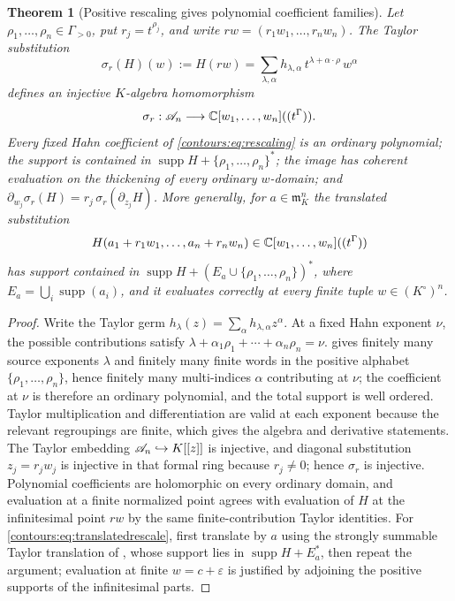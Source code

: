 \documentclass[11pt,letterpaper]{article}
\newtheorem{theorem}{Theorem}[section]
\theoremstyle{definition}
\theoremstyle{remark}
\newcommand{\m}{\mathfrak m}\newcommand{\st}{\operatorname{st}}
\newcommand{\supp}{\operatorname{supp}}\newcommand{\Res}{\operatorname{Res}}
\numberwithin{equation}{section}
\begin{document}
\begin{theorem}[Positive rescaling gives polynomial coefficient families]
\label{contours:thm:rescaling}
Let $\rho_1,\ldots,\rho_n\in\Gamma_{>0}$, put $r_j=t^{\rho_j}$, and write
$rw=(r_1w_1,\ldots,r_nw_n)$. The Taylor substitution
\begin{equation}\label{contours:eq:rescaling}
  \sigma_r(H)(w):=H(rw)
  =\sum_{\lambda,\alpha}h_{\lambda,\alpha}\,
   t^{\lambda+\alpha\cdot\rho}\,w^\alpha
\end{equation}
defines an \emph{injective $K$-algebra homomorphism}
\[
  \sigma_r:\mathscr A_n\longrightarrow\mathbb C[w_1,\ldots,w_n]((t^\Gamma)) .
\]
Every fixed Hahn coefficient of \eqref{contours:eq:rescaling} is an ordinary
polynomial; the support is contained in $\supp H+\{\rho_1,\ldots,\rho_n\}^*$; the
image has coherent evaluation on the thickening of every ordinary $w$-domain; and
$\partial_{w_j}\sigma_r(H)=r_j\,\sigma_r(\partial_{z_j}H)$. More generally, for
$a\in\m_K^n$ the translated substitution
\begin{equation}\label{contours:eq:translatedrescale}
  H(a_1+r_1w_1,\ldots,a_n+r_nw_n)\in\mathbb C[w_1,\ldots,w_n]((t^\Gamma))
\end{equation}
has support contained in $\supp H+(E_a\cup\{\rho_1,\ldots,\rho_n\})^*$, where
$E_a=\bigcup_i\supp(a_i)$, and it evaluates correctly at every finite tuple
$w\in(K^\circ)^n$.
\end{theorem}
\begin{proof}
Write the Taylor germ $h_\lambda(z)=\sum_\alpha h_{\lambda,\alpha}z^\alpha$. At a
fixed Hahn exponent $\nu$, the possible contributions satisfy
$\lambda+\alpha_1\rho_1+\cdots+\alpha_n\rho_n=\nu$. 
gives finitely many source exponents $\lambda$ and finitely many finite words in the
positive alphabet $\{\rho_1,\ldots,\rho_n\}$, hence finitely many multi-indices
$\alpha$ contributing at $\nu$; the coefficient at $\nu$ is therefore an ordinary
polynomial, and the total support is well ordered. Taylor multiplication and
differentiation are valid at each exponent because the relevant regroupings are
finite, which gives the algebra and derivative statements. The Taylor embedding
$\mathscr A_n\hookrightarrow K[[z]]$ is injective, and diagonal substitution $z_j=r_jw_j$ is
injective in that formal ring because $r_j\ne0$; hence $\sigma_r$ is injective.
Polynomial coefficients are holomorphic on every ordinary domain, and evaluation at a
finite normalized point agrees with evaluation of $H$ at the infinitesimal point
$rw$ by the same finite-contribution Taylor identities. For
\eqref{contours:eq:translatedrescale}, first translate by $a$ using the strongly
summable Taylor translation of \cite[\S3]{Geometry}, whose support lies in
$\supp H+E_a^*$, then repeat the argument; evaluation at finite $w=c+\varepsilon$ is
justified by adjoining the positive supports of the infinitesimal parts.
\end{proof}
\end{document}
